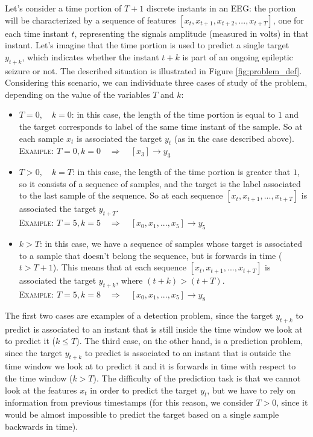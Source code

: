 Let's consider a time portion of $T+1$ discrete instants in an EEG: the portion will be characterized by a sequence of features $[x_t, x_{t+1}, x_{t+2}, ... , x_{t+T}]$, one for each time instant $t$, representing the signals amplitude (measured in volts) in that instant. Let's imagine that the time portion is used to predict a single target $y_{t+k}$, which indicates whether the instant $t+k$ is part of an ongoing epileptic seizure or not. The described situation is illustrated in Figure \ref{fig:problem_def}. Considering this scenario, we can individuate three cases of study of the problem, depending on the value of the variables $T$ and $k$:
\begin{itemize}
    \item $T=0,\quad k=0$: in this case, the length of the time portion is equal to $1$ and the target corresponds to label of the same time instant of the sample. So at each sample $x_t$ is associated the target $y_t$ (as in the case described above).\\
    \textsc{Example:} \quad$T=0, k=0\quad \Rightarrow{}\quad [x_3] \rightarrow{} y_3$
    \item $T>0,\quad k=T$: in this case, the length of the time portion is greater that $1$, so it consists of a sequence of samples, and the target is the label associated to the last sample of the sequence. So at each sequence $[x_t, x_{t+1}, ... , x_{t+T}]$ is associated the target $y_{t+T}$.\\
    \textsc{Example:} \quad$T=5, k=5\quad \Rightarrow{}\quad [x_0, x_1, ..., x_5] \rightarrow{} y_5$
    \item $k>T$: in this case, we have a sequence of samples whose target is associated to a sample that doesn't belong the sequence, but is forwards in time ($t>T+1$). This means that at each sequence $[x_t, x_{t+1}, ... , x_{t+T}]$ is associated the target $y_{t+k}$, where $(t+k) > (t+T)$.\\
    \textsc{Example:} \quad$T=5, k=8\quad \Rightarrow{}\quad [x_0, x_1, ..., x_5] \rightarrow{} y_8$
\end{itemize}
The first two cases are examples of a detection problem, since the target $y_{t+k}$ to predict is associated to an instant that is still inside the time window we look at to predict it ($k \leq T$). The third case, on the other hand, is a prediction problem, since the target $y_{t+k}$ to predict is associated to an instant that is outside the time window we look at to predict it and it is forwards in time with respect to the time window ($k > T$). The difficulty of the prediction task is that we cannot look at the features $x_t$ in order to predict the target $y_t$, but we have to rely on information from previous timestamps (for this reason, we consider $T>0$, since it would be almost impossible to predict the target based on a single sample backwards in time).

